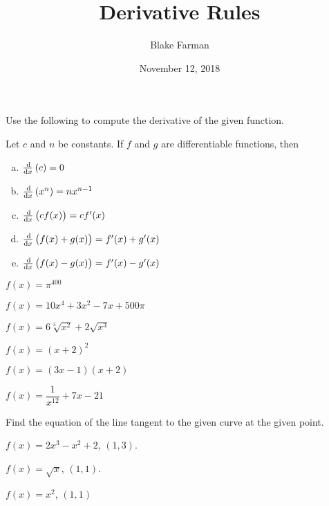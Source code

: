 \documentclass[10pt]{amsart}
\title{Derivative Rules}
\date{November 12, 2018}
\author{Blake Farman}
\begin{document}
\maketitle

\makenameslot

\noindent Use the following to compute the derivative of the given function.
\begin{thm*}
  Let \(c\) and \(n\) be constants.
  If \(f\) and \(g\) are differentiable functions, then
  \begin{enumerate}[(a)]
  \item
    \(\frac{\dif}{\dif x}\left(c\right) = 0\)
  \item
    \(\frac{\dif}{\dif x}\left(x^n\right) = nx^{n-1}\)
  \item
    \(\frac{\dif}{\dif x}\left(cf(x)\right) = cf^\prime(x)\)
  \item
    \(\frac{\dif}{\dif x}\left(f(x) + g(x)\right) = f^\prime(x) + g^\prime(x)\)
  \item
    \(\frac{\dif}{\dif x}\left(f(x) - g(x)\right) = f^\prime(x) - g^\prime(x)\)
  \end{enumerate}
\end{thm*}

\begin{thm}
  \(f(x) = \pi^{400}\)
\end{thm}

\vspace{1.5in}
\begin{thm}
  \(f(x) = 10x^4 + 3x^2 - 7x + 500\pi\)
\end{thm}

\newpage

\begin{thm}
  \(f(x) = 6\sqrt[3]{x^2} + 2\sqrt{x^3}\)
\end{thm}

\vspace{1.5in}

\begin{thm}
  \(f(x) = (x + 2)^2\)
\end{thm}

\vspace{1.5in}

\begin{thm}
  \(f(x) = (3x - 1)(x + 2)\)
\end{thm}

\vspace{1.5in}

\begin{thm}
  \(f(x) = \dfrac{1}{x^{12}} + 7x - 21\)
\end{thm}

\newpage

\noindent Find the equation of the line tangent to the given curve at the given point.
\begin{thm}
  \(f(x) = 2x^3 - x^2 + 2\), \((1,3)\).
\end{thm}

\vspace{2in}

\begin{thm}
  \(f(x) = \sqrt{x}\), \((1,1)\).
\end{thm}

\vspace{2in}

\begin{thm}
  \(f(x) = x^2\), \((1,1)\)
\end{thm}
\end{document}
